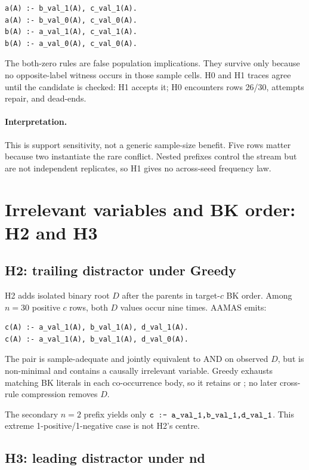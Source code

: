 \documentclass[11pt]{article}
\DeclareRobustCommand{\code}[1]{\texttt{\detokenize{#1}}}
\newcommand{\interpretation}{\paragraph{Interpretation.}}
\begin{document}
\begin{lstlisting}
a(A) :- b_val_1(A), c_val_1(A).
a(A) :- b_val_0(A), c_val_0(A).
b(A) :- a_val_1(A), c_val_1(A).
b(A) :- a_val_0(A), c_val_0(A).
\end{lstlisting}

The both-zero rules are false population implications. They survive only
because no opposite-label witness occurs in those sample cells. H0 and H1
traces agree until the candidate is checked: H1 accepts it; H0 encounters
rows 26/30, attempts repair, and dead-ends.

\interpretation
This is support sensitivity, not a generic sample-size benefit. Five rows
matter because two instantiate the rare conflict. Nested prefixes control the
stream but are not independent replicates, so H1 gives no across-seed
frequency law.

\section{Irrelevant variables and BK order: H2 and H3}

\subsection{H2: trailing distractor under Greedy}

H2 adds isolated binary root \(D\) after the parents in target-\(c\) BK order.
Among \(n=30\) positive \(c\) rows, both \(D\) values occur nine times. AAMAS
emits:

\begin{lstlisting}
c(A) :- a_val_1(A), b_val_1(A), d_val_1(A).
c(A) :- a_val_1(A), b_val_1(A), d_val_0(A).
\end{lstlisting}

The pair is sample-adequate and jointly equivalent to AND on observed \(D\),
but is non-minimal and contains a causally irrelevant variable. Greedy
\code{folding_space(bk)} exhausts matching BK literals in each co-occurrence
body, so it retains \code{d_val_1} or \code{d_val_0}; no later cross-rule
compression removes \(D\).

The secondary \(n=2\) prefix yields only
\(\code{c :- a_val_1,b_val_1,d_val_1}\). This extreme
1-positive/1-negative case is not H2's centre.

\subsection{H3: leading distractor under nd}
\end{document}
